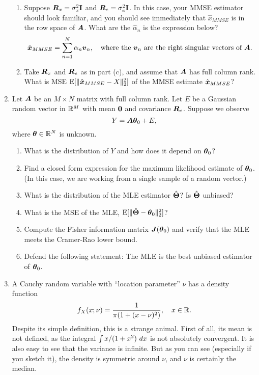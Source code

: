 \documentclass[11pt]{article}
\begin{document}
\begin{enumerate}
\begin{enumerate}
	\item Suppose $\boldsymbol{R}_x = \sigma_x^2\mathbf{I}$ and $\boldsymbol{R}_e = \sigma_e^2\mathbf{I}$.  In this case, your MMSE estimator should look familiar, and you should see immediately that $\hat{x}_{MMSE}$ is in the row space of $\boldsymbol{A}$.  What are the $\hat{\alpha}_n$ is the expression below?
	\[
		\hat{\boldsymbol{x}}_{MMSE} = \sum_{n=1}^N\alpha_n\boldsymbol{v}_n,\quad\text{where the $\boldsymbol{v}_n$ are the right singular vectors of $\boldsymbol{A}$}.
	\]
	
	\item Take $\boldsymbol{R}_x$ and $\boldsymbol{R}_e$ as in part (c), and assume that $\boldsymbol{A}$ has full column rank.  What is MSE $\operatorname{E}[\|\hat{\boldsymbol{x}}_{MMSE}-X\|_2^2]$ of the MMSE estimate $\hat{\boldsymbol{x}}_{MMSE}$?
\end{enumerate}


\vspace{4mm} 
\item Let $\boldsymbol{A}$ be an $M\times N$ matrix with full column rank.  Let $E$ be a Gaussian random vector in $\mathbb{R}^M$ with mean $\boldsymbol{0}$ and covariance $\boldsymbol{R}_e$.   Suppose we observe
\[
	Y = \boldsymbol{A}\boldsymbol{\theta}_0 + E,
\]
where $\boldsymbol{\theta}\in\mathbb{R}^N$ is unknown.
\begin{enumerate}
	\item What is the distribution of $Y$ and how does it depend on $\boldsymbol{\theta}_0$?
	\item Find a closed form expression for the maximum likelihood estimate of $\boldsymbol{\theta}_0$.  (In this case, we are working from a single sample of a random vector.)
	\item What is the distribution of the MLE estimator $\hat{\boldsymbol{\Theta}}$?  Is $\hat{\boldsymbol{\Theta}}$ unbiased?
	\item What is the MSE of the MLE, $\operatorname{E}[\|\hat{\boldsymbol{\Theta}}-\boldsymbol{\theta}_0\|_2^2]$?
	\item Compute the Fisher information matrix $\boldsymbol{J}(\boldsymbol{\theta}_0)$ and verify that the MLE meets the Cramer-Rao lower bound.
	\item Defend the following statement: The MLE is the best unbiased estimator of $\boldsymbol{\theta}_0$.  
\end{enumerate}

\vspace{4mm} 
\item A Cauchy random variable with ``location parameter'' $\nu$ has a density function
\begin{equation}
	\label{eq:cauchyrv}
	f_X(x;\nu) = \frac{1}{\pi(1+(x-\nu)^2)},\quad x\in\mathbb{R}.
\end{equation}
Despite its simple definition, this is a strange animal.  First of all, its mean is not defined, as the integral $\int x/(1+x^2)~dx$ is not absolutely convergent.  It is also easy to see that the variance is infinite.  But as you can see (especially if you sketch it), the density is symmetric around $\nu$, and $\nu$ is certainly the median.  


\end{enumerate}
\end{document}
